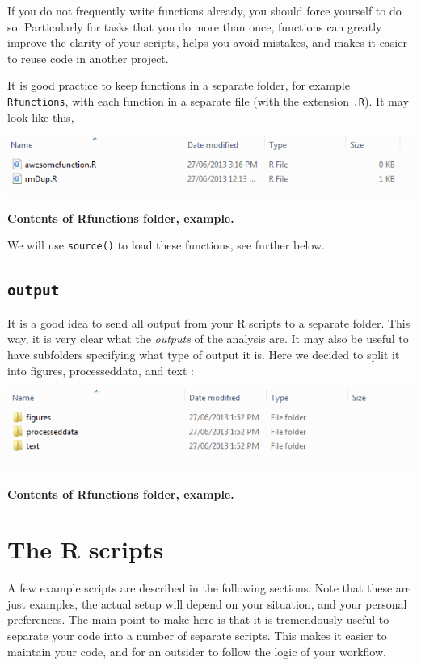 \documentclass[]{book}
\begin{document}
If you do not frequently write functions already, you should force yourself to do so. Particularly for tasks that you do more than once, functions can greatly improve the clarity of your scripts, helps you avoid mistakes, and makes it easier to reuse code in another project.

It is good practice to keep functions in a separate folder, for example \texttt{Rfunctions}, with each function in a separate file (with the extension \texttt{.R}). It may look like this,

\includegraphics[width=0.7\linewidth]{screenshots/rfunctions}

\textbf{Contents of Rfunctions folder, example.}

We will use \texttt{source()} to load these functions, see further below.

\hypertarget{output}{%
\subsection{\texorpdfstring{\texttt{output}}{output}}\label{output}}

It is a good idea to send all output from your R scripts to a separate folder. This way, it is very clear what the \emph{outputs} of the analysis are. It may also be useful to have subfolders specifying what type of output it is. Here we decided to split it into figures, processeddata, and text :

\includegraphics[width=0.7\linewidth]{screenshots/output}

\textbf{Contents of Rfunctions folder, example.}

\hypertarget{the-r-scripts}{%
\section{The R scripts}\label{the-r-scripts}}

A few example scripts are described in the following sections. Note that these are just examples, the actual setup will depend on your situation, and your personal preferences. The main point to make here is that it is tremendously useful to separate your code into a number of separate scripts. This makes it easier to maintain your code, and for an outsider to follow the logic of your workflow.
\end{document}

